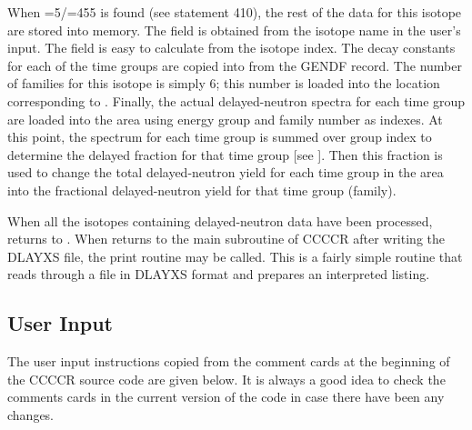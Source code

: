 When =5/=455 is found (see statement
410), the rest of the data
for this isotope are stored into memory.  The  field
is obtained from the isotope name in the user's input.  The
 field is easy to calculate from the isotope index.
The decay constants for each of the time groups are copied into
 from the GENDF record.  The number of families
for this isotope is simply 6; this number is loaded into the
location corresponding to .  Finally, the actual
delayed-neutron spectra for each time group are loaded into
the  area using energy group and family number as
indexes. At this point, the spectrum for each time group is
summed over group index to determine the delayed fraction for that
time group [see ].  Then this fraction is used
to change the total delayed-neutron yield for each time group
in the  area into the fractional delayed-neutron
yield for that time group (family).

When all the isotopes containing delayed-neutron data have been
processed,  returns to .  When
 returns to the main subroutine of CCCCR after
writing the DLAYXS file, the print routine
 may be called.  This
is a fairly simple routine that reads through a file
in DLAYXS format and prepares an interpreted listing.


\subsection{User Input}
\label{ssCCCCR_inp}

The user input instructions copied from the comment cards at the
beginning of the CCCCR source code are given below.  It is always
a good idea to check the comments cards in the current version of
the code in case there have been any changes.


